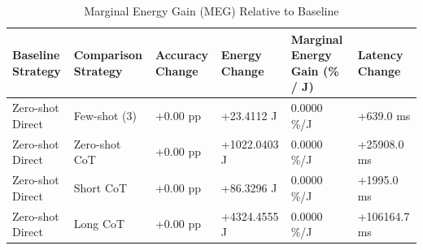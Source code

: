 \begin{table}
\caption{Marginal Energy Gain (MEG) Relative to Baseline}
\label{tab:marginal_energy_gain}
\begin{tabular}{llllll}
\toprule
Baseline Strategy & Comparison Strategy & Accuracy Change & Energy Change & Marginal Energy Gain (\% / J) & Latency Change \\
\midrule
Zero-shot Direct & Few-shot (3) & +0.00 pp & +23.4112 J & 0.0000 \%/J & +639.0 ms \\
Zero-shot Direct & Zero-shot CoT & +0.00 pp & +1022.0403 J & 0.0000 \%/J & +25908.0 ms \\
Zero-shot Direct & Short CoT & +0.00 pp & +86.3296 J & 0.0000 \%/J & +1995.0 ms \\
Zero-shot Direct & Long CoT & +0.00 pp & +4324.4555 J & 0.0000 \%/J & +106164.7 ms \\
\bottomrule
\end{tabular}
\end{table}

